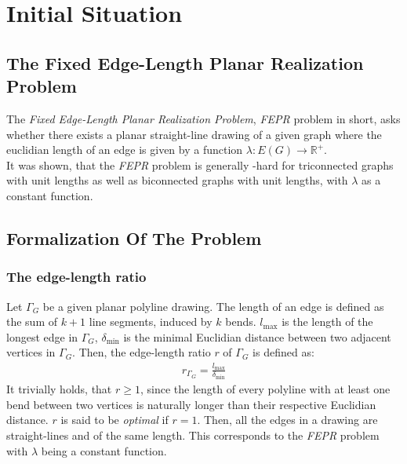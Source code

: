 \section{Initial Situation}\label{section:initial_situation}

\subsection{The Fixed Edge-Length Planar Realization Problem}

The \emph{Fixed Edge-Length Planar Realization Problem}, \emph{FEPR} problem in short, asks whether there exists a planar straight-line drawing of a given graph where the euclidian length of an edge is given by a function $\lambda: E(G) \to \mathbb{R}^+$.
\\
It was shown, that the \emph{FEPR} problem is generally \NP-hard for triconnected graphs with unit lengths as well as biconnected graphs with unit lengths, with $\lambda$ as a constant function. \cite[P. 2]{straight-line_2-trees}

\subsection{Formalization Of The Problem}
\subsubsection{The edge-length ratio}
Let $\Gamma_G$ be a given planar polyline drawing. The length of an edge is defined as the sum of $k+1$ line segments, induced by $k$ bends. $l_{\max}$ is the length of the longest edge in $\Gamma_G$, $\delta_{\min}$ is the minimal Euclidian distance between two adjacent vertices in $\Gamma_G$. Then, the edge-length ratio $r$ of $\Gamma_G$ is defined as:
\begin{align}
	r_{\Gamma_G} = \frac{l_{\max}}{\delta_{\min}} 
\end{align}
It trivially holds, that $r\geq1$, since the length of every polyline with at least one bend between two vertices is naturally longer than their respective Euclidian distance. $r$ is said to be \emph{optimal} if $r=1$. Then, all the edges in a drawing are straight-lines and of the same length. This corresponds to the \emph{FEPR} problem with $\lambda$ being a constant function.
